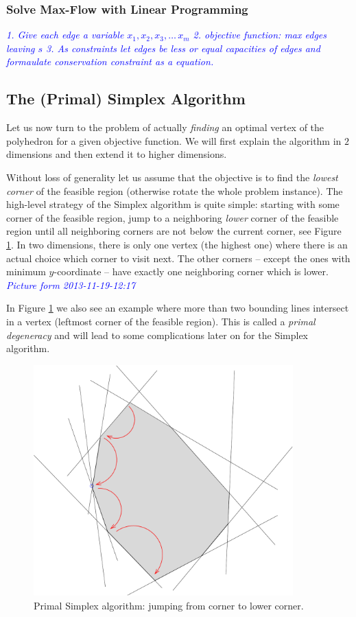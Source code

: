 \documentclass{article}
\begin{document}
\subsubsection{Solve Max-Flow with Linear Programming}

\textcolor{blue}{\emph{1. Give each edge a variable $x_1, x_2, x_3, \dots\, x_m$ 2. objective function: max edges leaving $s$ 3. As constraints let edges be less or equal capacities of edges and formaulate conservation constraint as a equation.}}


\subsection{The (Primal) Simplex Algorithm}
Let us now turn to the problem of actually \emph{finding} an optimal vertex of the polyhedron for a given objective function. We will first explain the algorithm in $2$ dimensions and then extend it to higher dimensions.

Without loss of generality let us assume that the objective is to find the \emph{lowest corner} of the feasible region (otherwise rotate the whole problem instance). The high-level strategy of the Simplex algorithm is quite simple:
starting with some corner of the feasible region, jump to a neighboring \emph{lower} corner of the feasible region until all neighboring corners are not below the current corner, see Figure \ref{fig:simplexPrimal}. In two dimensions, there is only one vertex (the highest one) where there is an actual choice which corner to visit next. The other corners -- except the ones with minimum $y$-coordinate -- have exactly one neighboring corner which is lower. \textcolor{blue}{\emph{Picture form 2013-11-19-12:17}}

In Figure \ref{fig:simplexPrimal} we also see an example where more than two bounding lines intersect in a vertex (leftmost corner of the feasible region). This is called a \emph{primal degeneracy} and will lead to some complications later on for the Simplex algorithm.


\begin{figure}
\includegraphics[width=10cm]{Figs/simplexPrimal.pdf}
\caption{Primal Simplex algorithm: jumping from corner to lower corner.}\label{fig:simplexPrimal}
\end{figure}
\end{document}
